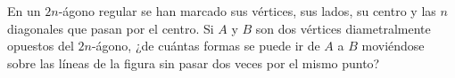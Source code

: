En un $2n$-ágono regular se han marcado sus vértices, sus lados, su centro y las $n$ diagonales que pasan por el centro. Si $A$ y $B$ son dos vértices diametralmente opuestos del $2n$-ágono, ¿de cuántas formas se puede ir de $A$ a $B$ moviéndose sobre las líneas de la figura sin pasar dos veces por el mismo punto?
